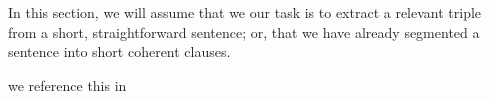 
In this section, we will assume that we our task is to extract a relevant
  triple from a short, straightforward sentence; or, that we have already 
  segmented a sentence into short coherent clauses.


 we reference this in 
